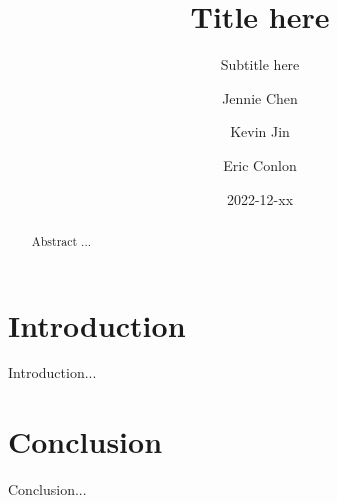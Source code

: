 \documentclass[format=sigconf, nonacm=true, review=true, screen=true]{acmart}
\title{Title here}
\subtitle{Subtitle here}
\author{Jennie Chen}
\author{Kevin Jin}
\author{Eric Conlon}
\date{2022-12-xx}
\begin{document}
\begin{abstract}

Abstract ...

\end{abstract}

\maketitle

\section{Introduction}

Introduction...

\section{Conclusion}

Conclusion...



\end{document}
